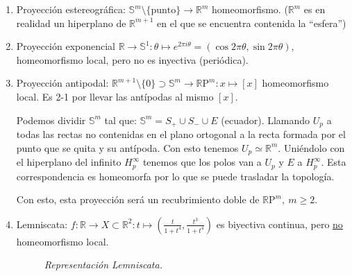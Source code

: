 \begin{ej}[¡Importantes!]
\begin{enumerate}
    \item Proyección estereográfica: $\mathbb{S}^{m} \setminus \{\text{punto}\} \rightarrow \mathbb{R}^m$ homeomorfismo. ($\mathbb{R}^{m}$ es en realidad un hiperplano de $\mathbb{R}^{m+1}$ en el que se encuentra contenida la ``esfera'')

    \item Proyección exponencial $\mathbb{R} \rightarrow \mathbb{S}^1: \theta \mapsto e^{2\pi i\theta} = \left( \cos 2\pi \theta, \sin 2\pi \theta \right)$, homeomorfismo local, pero no es inyectiva (periódica).

    \item Proyección antipodal: $\mathbb{R}^{m+1}\setminus \{0\} \supset \mathbb{S}^m \rightarrow \mathbb{R}\mathrm{P}^{m}: x \mapsto \left[ x \right]$ homeomorfismo local. Es 2-1 por llevar las antípodas al mismo $\left[ x \right]$. 

    Podemos dividir $\mathbb{S}^{m}$ tal que: $\mathbb{S}^{m} = S_{+} \cup S_{-} \cup E$ (ecuador). Llamando $U_p$ a todas las rectas no contenidas en el plano ortogonal a la recta formada por el punto que se quita y su antípoda. Con esto tenemos $U_p \simeq \mathbb{R}^{m}$. Uniéndolo con el hiperplano del infinito $H_p^{\infty}$ tenemos que los polos van a $U_p$ y $E$ a $H_p^{\infty}$. Esta correspondencia es homeomorfa por lo que se puede trasladar la topología.

    Con esto, esta proyección será un recubrimiento doble de $\mathbb{R}\mathrm{P}^m,\ m \ge 2$.

    \item Lemniscata: $f: \mathbb{R} \rightarrow X \subset \mathbb{R}^2: t \mapsto \left( \frac{t}{1 + t^4}, \frac{t^3}{1 + t^4} \right)$ es biyectiva continua, pero \underline{no} homeomorfismo local.

    \begin{figure}[H]
        \centering
        \caption{\textit{Representación Lemniscata.}}
        \label{fig:lemniscata}
    \end{figure}


\end{enumerate}
\end{ej}

